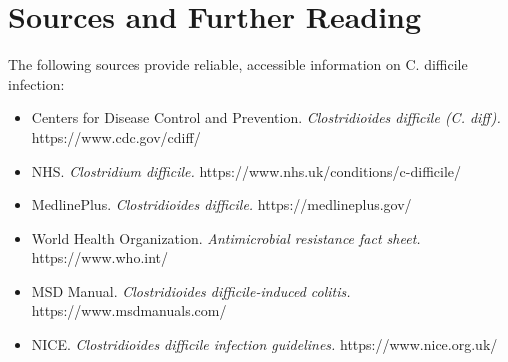 \section*{Sources and Further Reading}
The following sources provide reliable, accessible information on C. difficile infection:
\begin{itemize}
    \item Centers for Disease Control and Prevention. \textit{Clostridioides difficile (C. diff).} https://www.cdc.gov/cdiff/
    \item NHS. \textit{Clostridium difficile.} https://www.nhs.uk/conditions/c-difficile/
    \item MedlinePlus. \textit{Clostridioides difficile.} https://medlineplus.gov/
    \item World Health Organization. \textit{Antimicrobial resistance fact sheet.} https://www.who.int/
    \item MSD Manual. \textit{Clostridioides difficile-induced colitis.} https://www.msdmanuals.com/
    \item NICE. \textit{Clostridioides difficile infection guidelines.} https://www.nice.org.uk/
\end{itemize}
